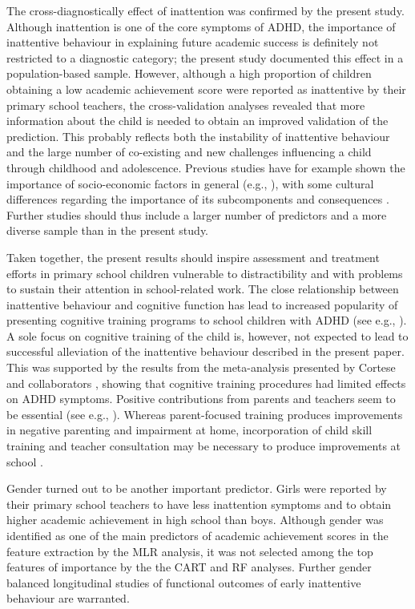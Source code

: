 \documentclass[10pt,letterpaper]{article}
\begin{document}
{The cross-diagnostically effect of inattention was confirmed by the present study. Although  inattention is one of the core symptoms of ADHD,  the importance of inattentive behaviour in explaining future academic success is definitely not restricted to a diagnostic category; the present study documented this effect in a population-based sample.  However, although a high proportion of children obtaining a low academic achievement score were reported as inattentive by their primary school teachers, the cross-validation analyses revealed that more information about the child is needed to obtain an improved validation of the prediction. This probably reflects both the instability of inattentive behaviour and the large number of co-existing and new challenges influencing a child through childhood and adolescence.  Previous studies have for example shown the  importance of socio-economic factors in general (e.g., \cite{Russel2015}), with some cultural differences regarding the importance of its subcomponents \cite{Boe2012} and consequences \cite{Ellertsen2016}. Further studies should thus include a larger number of predictors and a more diverse sample than in the present study. 


Taken together, the present results should inspire assessment and treatment efforts in primary school children vulnerable to distractibility and with problems to sustain their attention in school-related work. 
The close relationship between inattentive behaviour and cognitive function \cite{Berger2013, Berger2015} has lead to increased popularity of presenting cognitive training programs to school children with ADHD (see e.g., \cite{Rapport2013, Tamm2017}). A sole focus on cognitive training of the child is, however, not expected to lead to successful alleviation of the inattentive behaviour described in the present paper. This was supported by the results from the meta-analysis presented by Cortese and collaborators  \cite{Cortese2015}, showing that cognitive training procedures had limited effects on ADHD symptoms. Positive contributions from parents and teachers seem to be essential (see e.g., \cite{Pfiffner2014}). Whereas parent-focused training produces improvements in negative parenting and impairment at home, incorporation of child skill training and teacher consultation may be necessary to produce improvements at school \cite{Haack2016}. 

Gender turned out to be another important predictor. Girls were reported by their primary school teachers to have less inattention symptoms and to obtain higher academic achievement in high school than boys.  Although gender was identified as one of the main predictors of academic achievement scores in the feature extraction by the MLR analysis, it was not selected among the top features of importance by the the CART and RF analyses.  Further gender balanced longitudinal studies of functional outcomes of early inattentive behaviour are warranted. \\


}
\end{document}
